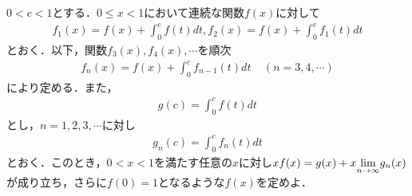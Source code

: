\documentclass[a4j]{jarticle}
\title{}
\begin{document}

\begin{oframed}
$0<c<1$とする．$0\le x<1$において連続な関数$f(x)$に対して
     \begin{align*}
     f_1(x)=f(x)+\int_0^cf(t)dt , f_2(x)=f(x)+\int_0^cf_1(t)dt
     \end{align*}
とおく．以下，関数$f_3(x),f_4(x),\cdots$を順次
     \begin{align*}
     f_n(x)=f(x)+\int_0^cf_{n-1}(t)dt \ \ \ \ \ (n=3,4,\cdots)
     \end{align*}
により定める．また，
     \begin{align*}
     g(c)=\int_0^cf(t)dt
     \end{align*}
とし，$n=1,2,3,\cdots$に対し          
     \begin{align*}
     g_n(c)=\int_0^cf_n(t)dt
     \end{align*}
とおく．このとき，$0<x<1$を満たす任意の$x$に対し$xf(x)=g(x)+x{\displaystyle \lim_{n\to\infty}}g_n(x)$が成り立ち，さらに$f(0)=1$となるような$f(x)$を定めよ．     
\end{oframed}
\end{document}
